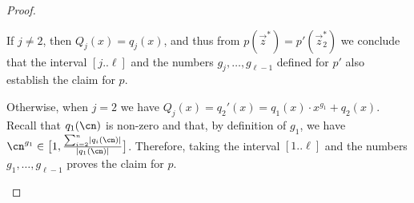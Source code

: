 \begin{proof}
\begin{claimproof}
\begin{description}
\begin{description}
              If $j \neq 2$, then $Q_j(x) = q_j(x)$,
              and thus from $p(\vec z^*) = p'(\vec z_2^*)$
              we conclude that the interval $[j..\ell]$
              and the numbers ${g_j},\dots,{g_{\ell-1}}$
              defined for $p'$ also establish the claim for $p$.
  
              Otherwise, when $j = 2$ we have $Q_j(x) = q_2'(x) = q_1(x) \cdot
                x^{g_1} + q_2(x)$.
              Recall that $q_1(\cn)$ is non-zero and that,
              by definition of $g_1$, we have $\cn^{g_1} \in
                \big[1,\frac{\sum_{i=2}^n \abs{q_i(\cn)}}{\abs{q_1(\cn)}}\big]$.
              Therefore,
              taking the interval $[1..\ell]$ and the numbers
              $g_1,\dots,g_{\ell-1}$ proves
              the claim for $p$.
              \claimqedhere%
          \end{description}
      \end{description}
    \end{claimproof}


\end{proof}
